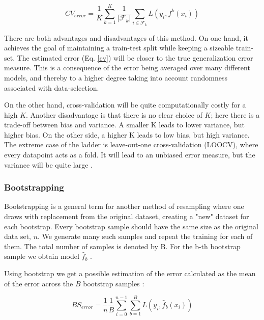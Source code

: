 \begin{equation}\label{cv}
    CV_{error} = \frac{1}{K} \sum_{k=1}^{K} \frac{1}{|\mathcal{F}_k|} \sum_{i \in \mathcal{F}_k} L\left(y_i, f^{k}({x}_i)\right) 
\end{equation}

There are both advantages and disadvantages of this method. On one hand, it achieves the goal of maintaining a train-test split while keeping a sizeable train-set. 
The estimated error (Eq. \ref{cv}) will be closer to the true generalization error measure. This is a consequence of the error being averaged over many different models, and thereby to a higher degree taking into account randomness associated with data-selection.  

On the other hand, cross-validation will be quite computationally costly for a high $K$. Another disadvantage is that there is no clear choice of $K$; here there is a trade-off between bias and variance. A smaller K leads to lower variance, but higher bias. On the other side, a higher K leads to low bias, but high variance. The extreme case of the ladder is leave-out-one cross-validation (LOOCV), where every datapoint acts as a fold. It will lead to an unbiased error measure, but the variance will be quite large \citep[p. 242]{hastie}.


\subsubsection{Bootstrapping}
Bootstrapping is a general term for another method of resampling where one draws with replacement from the original dataset, creating a "new" dataset for each bootstrap. Every bootstrap sample should have the same size as the original data set, $n$. We generate many such samples and repeat the training for each of them. The total number of samples is denoted by B. 
For the b-th bootstrap sample we obtain model $\hat{f}_b$ \citep[p. 249]{hastie}.

Using bootstrap we get a possible estimation of the error calculated as the mean of the error across the $B$ bootstrap samples \cite[p. 250]{hastie}:

\begin{equation}
    BS_{error} = \frac{1}{n}\frac{1}{B}\sum_{i=0}^{n-1}\sum_{b=1}^{B} L\left(y_i, \hat{f}_b(x_i)\right)
\end{equation}
\


